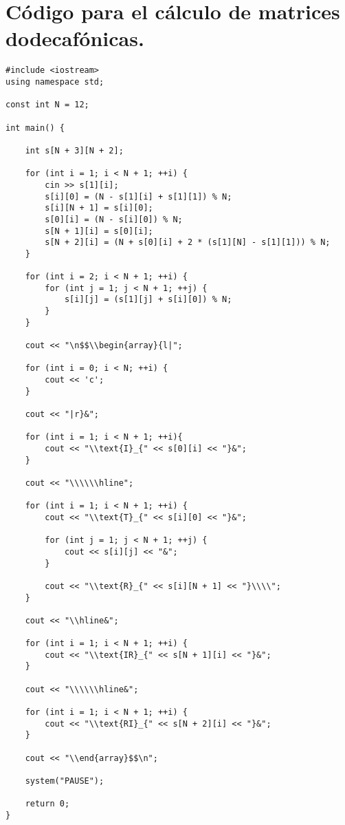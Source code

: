 \chapter{Código para el cálculo de matrices dodecafónicas.}
		\label{app:codigo}
		\newpage
		\begin{lstlisting}
#include <iostream>
using namespace std;

const int N = 12;

int main() {

	int s[N + 3][N + 2];

	for (int i = 1; i < N + 1; ++i) {
		cin >> s[1][i];
		s[i][0] = (N - s[1][i] + s[1][1]) % N;
		s[i][N + 1] = s[i][0];
		s[0][i] = (N - s[i][0]) % N;
		s[N + 1][i] = s[0][i];
		s[N + 2][i] = (N + s[0][i] + 2 * (s[1][N] - s[1][1])) % N;
	}

	for (int i = 2; i < N + 1; ++i) {
		for (int j = 1; j < N + 1; ++j) {
			s[i][j] = (s[1][j] + s[i][0]) % N;
		}
	}

	cout << "\n$$\\begin{array}{l|";
	
	for (int i = 0; i < N; ++i) {
		cout << 'c';
	}
	
	cout << "|r}&";

	for (int i = 1; i < N + 1; ++i){
		cout << "\\text{I}_{" << s[0][i] << "}&";
	}
	
	cout << "\\\\\\hline";

	for (int i = 1; i < N + 1; ++i) {
		cout << "\\text{T}_{" << s[i][0] << "}&";
		
		for (int j = 1; j < N + 1; ++j) {
			cout << s[i][j] << "&";
		}
		
		cout << "\\text{R}_{" << s[i][N + 1] << "}\\\\";
	}

	cout << "\\hline&";
	
	for (int i = 1; i < N + 1; ++i) {
		cout << "\\text{IR}_{" << s[N + 1][i] << "}&";
	}

	cout << "\\\\\\hline&";
	
	for (int i = 1; i < N + 1; ++i) {
		cout << "\\text{RI}_{" << s[N + 2][i] << "}&";
	}

	cout << "\\end{array}$$\n";

	system("PAUSE");

	return 0;
}


	\end{lstlisting}